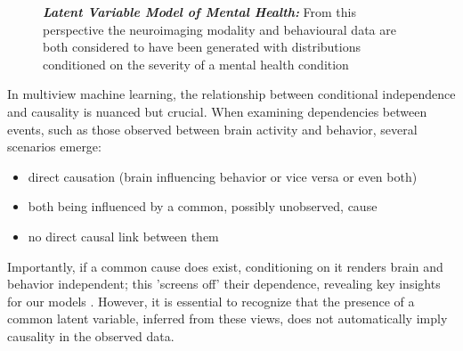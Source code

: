 \begin{figure}
    \centering
    \caption[Latent Variable Model of Mental Health]{\textit{\textbf{Latent Variable Model of Mental Health:}} From this perspective the neuroimaging modality and behavioural data are both considered to have been generated with distributions conditioned on the severity of a mental health condition}\label{fig:mentalhealthselfsupervised}
\end{figure}

In multiview machine learning, the relationship between conditional independence and causality is nuanced but crucial.
When examining dependencies between events, such as those observed between brain activity and behavior, several scenarios emerge:

\begin{itemize}
    \item direct causation (brain influencing behavior or vice versa or even both)
    \item both being influenced by a common, possibly unobserved, cause
    \item no direct causal link between them
\end{itemize}

Importantly, if a common cause does exist, conditioning on it renders brain and behavior independent; this 'screens off' their dependence, revealing key insights for our models \citep{reichenbach1956direction}.
However, it is essential to recognize that the presence of a common latent variable, inferred from these \gls{views}, does not automatically imply causality in the observed data.

